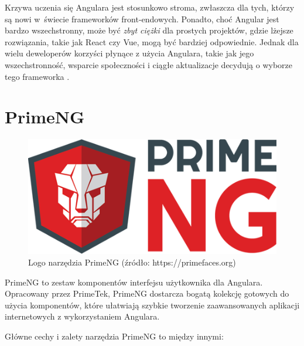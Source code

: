 Krzywa uczenia się Angulara jest stosunkowo stroma, zwłaszcza dla tych, którzy są nowi w~świecie frameworków front-endowych. Ponadto, choć Angular jest bardzo wszechstronny, może być \textit{zbyt ciężki} dla prostych projektów, gdzie lżejsze rozwiązania, takie jak React czy Vue, mogą być bardziej odpowiednie. Jednak dla wielu deweloperów korzyści płynące z użycia Angulara, takie jak jego wszechstronność, wsparcie społeczności i ciągłe aktualizacje decydują o wyborze tego frameworka \cite{angularSpecs}.

\section{PrimeNG}
\begin{figure}[h]
    \centering
    \includegraphics[width=0.5\linewidth]{./img/primeng.png}
    \caption{Logo narzędzia PrimeNG (źródło: https://primefaces.org)}
    \label{fig:PrimeNG}
\end{figure}

PrimeNG to zestaw komponentów interfejsu użytkownika dla Angulara. Opracowany przez PrimeTek, PrimeNG dostarcza bogatą kolekcję gotowych do użycia komponentów, które ułatwiają szybkie tworzenie zaawansowanych aplikacji internetowych z wykorzystaniem Angulara.

Główne cechy i zalety narzędzia PrimeNG to między innymi:

